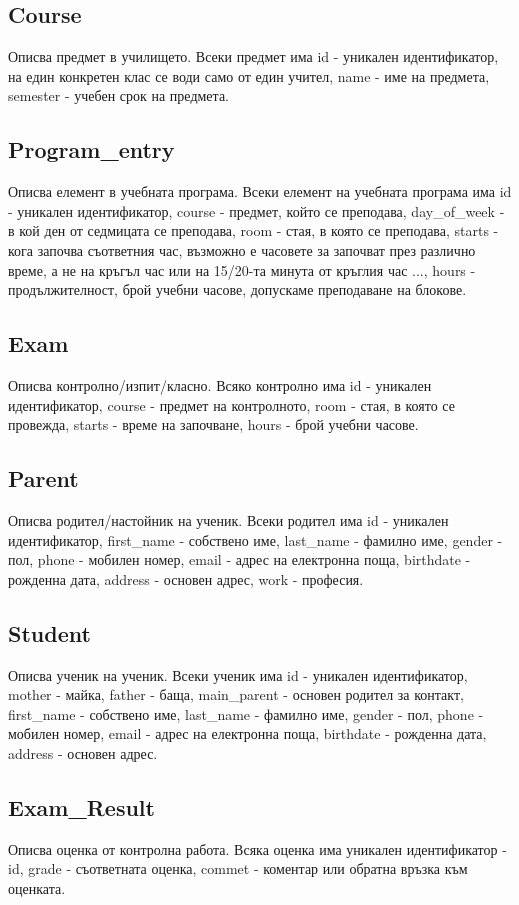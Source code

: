 \documentclass[a4paper, 12pt, x11names]{article}
\begin{document}
\subsection{Course}
Описва предмет в училището. Всеки предмет има id - уникален идентификатор,
на един конкретен клас се води само от един учител,
name - име на предмета, semester - учебен срок на предмета.
\subsection{Program\_entry}
Описва елемент в учебната програма.
Всеки елемент на учебната програма има id - уникален идентификатор,
course - предмет, който се преподава,
day\_of\_week - в кой ден от седмицата се преподава,
room - стая, в която се преподава,
starts - кога започва съответния час, възможно е часовете за започват през различно време,
а не на кръгъл час или на 15/20-та минута от кръглия час ..., hours - продължителност,
брой учебни часове, допускаме преподаване на блокове.
\subsection{Exam}
Описва контролно/изпит/класно.
Всяко контролно има id - уникален идентификатор,
course - предмет на контролното,
room - стая, в която се провежда,
starts - време на започване,
hours - брой учебни часове.
\subsection{Parent}
Описва родител/настойник на ученик.
Всеки родител има id - уникален идентификатор,
first\_name - собствено име,
last\_name - фамилно име,
gender - пол,
phone - мобилен номер,
email - адрес на електронна поща,
birthdate - рожденна дата,
address - основен адрес,
work - професия.
\subsection{Student}
Описва ученик на ученик.
Всеки ученик има id - уникален идентификатор,
mother - майка,
father - баща,
main\_parent - основен родител за контакт,
first\_name - собствено име,
last\_name - фамилно име,
gender - пол,
phone - мобилен номер,
email - адрес на електронна поща,
birthdate - рожденна дата,
address - основен адрес.
\subsection{Exam\_Result}
Описва оценка от контролна работа.
Всяка оценка има уникален идентификатор - id,
grade - съответната оценка,
commet - коментар или обратна връзка към оценката.
\end{document}
